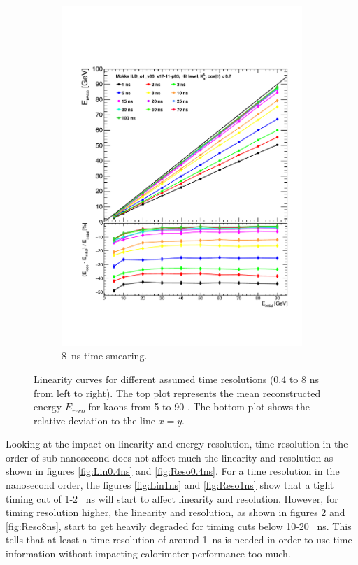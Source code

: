 \begin{figure}[htbp!]
\begin{subfigure}[t]{0.5\textwidth}
    \includegraphics[width=1\linewidth]{chap6/fig_TimingILD/8ns_Smearing/Linearity_TimeCuts_Smearing8ns}
    \vspace{-6ex}
    \caption{\SI{8}{\nano\second} time smearing.}  \label{fig:Lin8ns}
  \end{subfigure}
  \caption{Linearity curves for different assumed time resolutions (0.4 to 8 ns from left to right). The top plot represents the mean reconstructed energy $E_{reco}$ for kaons from 5 to 90 \GeV. The bottom plot shows the relative deviation to the line $x=y$.}
\end{figure}

Looking at the impact on linearity and energy resolution, time resolution in the order of sub-nanosecond does not affect much the linearity and resolution as shown in figures \ref{fig:Lin0.4ns} and \ref{fig:Reso0.4ns}. For a time resolution in the nanosecond order, the figures \ref{fig:Lin1ns} and \ref{fig:Reso1ns} show that a tight timing cut of 1-2 \SI{}{\nano\second} will start to affect linearity and resolution. However, for timing resolution higher, the linearity and resolution, as shown in figures \ref{fig:Lin8ns} and \ref{fig:Reso8ns}, start to get heavily degraded for timing cuts below 10-20 \SI{}{\nano\second}. This tells that at least a time resolution of around \SI{1}{\nano\second} is needed in order to use time information without impacting calorimeter performance too much.

